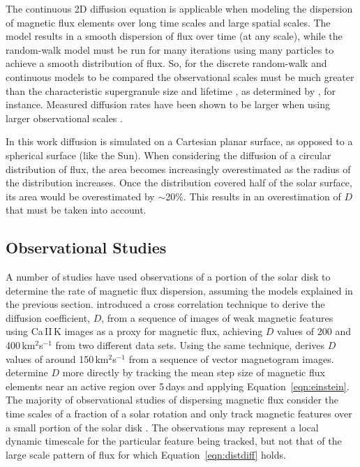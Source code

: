 The continuous 2D diffusion equation is applicable when modeling the dispersion of magnetic flux elements over long time scales and large spatial scales. The model results in a smooth dispersion of flux over time (at any scale), while the random-walk model must be run for many iterations using many particles to achieve a smooth distribution of flux. So, for the discrete random-walk and continuous models to be compared the observational scales must be much greater than the characteristic supergranule size and lifetime \citep{Sheeley:1992}, as determined by \cite{Schrijver:1997a}, for instance. 
Measured diffusion rates have been shown to be larger when using larger observational scales \citep{Hagenaar:1999}.

In this work diffusion is simulated on a Cartesian planar surface, as opposed to a spherical surface (like the Sun). When considering the diffusion of a circular distribution of flux, the area becomes increasingly overestimated as the radius of the distribution increases. Once the distribution covered half of the solar surface, its area would be overestimated by $\sim$20\%. This results in an overestimation of $D$ that must be taken into account.

\subsection{Observational Studies}\label{sect:obsstud}

A number of studies have used observations of a portion of the solar disk to determine the rate of magnetic flux dispersion, assuming the models explained in the previous section.
\cite{Mosher:1977} introduced a cross correlation technique to derive the diffusion coefficient, $D$, from a sequence of images of weak magnetic features using Ca\,II\,K images as a proxy for magnetic flux, achieving $D$ values of 200 and 400\,km$^2$s$^{-1}$ from two different data sets. Using the same technique, \cite{Wang:1988} derives $D$ values of around 150\,km$^2$s$^{-1}$ from a sequence of vector magnetogram images.
\cite{Lawrence:1993} determine $D$ more directly by tracking the mean step size of magnetic flux elements near an active region over 5\,days and applying Equation~\ref{eqn:einstein}.
The majority of observational studies of dispersing magnetic flux consider the time scales of a fraction of a solar rotation %
and only track magnetic features over a small portion of the solar disk \citep{Hagenaar:1997,Hagenaar:1999,Berger:1998}. %
The observations may represent a local dynamic timescale for the particular feature being tracked, but not that of the large scale pattern of flux for which Equation~\ref{eqn:distdiff} holds.

